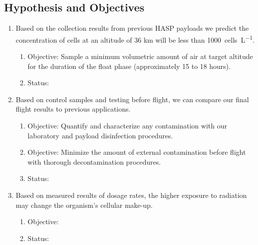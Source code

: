 \subsection{Hypothesis and Objectives}
\label{subsec:Hypothesis and Objectives}
\begin{enumerate}
	\item Based on the collection results from previous HASP payloads we predict the concentration of cells at an altitude of 36 km will be less than \SI{1000}{cells\per\liter}.
		\begin{enumerate}
			\item Objective: Sample a minimum volumetric amount of air at target altitude for the duration of the float phase (approximately 15 to 18 hours).
			\item Status:
		\end{enumerate}
%
	\item Based on control samples and testing before flight, we can compare our final flight results to previous applications.
		\begin{enumerate}
			\item Objective: Quantify and characterize any contamination with our laboratory and payload disinfection procedures.
			\item Objective: Minimize the amount of external contamination before flight with thorough decontamination procedures.
			\item Status:
		\end{enumerate}
%
	\item Based on measured results of dosage rates, the higher exposure to radiation may change the organism's cellular make-up.
		\begin{enumerate}
			\item Objective:
			\item Status:
		\end{enumerate}	
\end{enumerate}